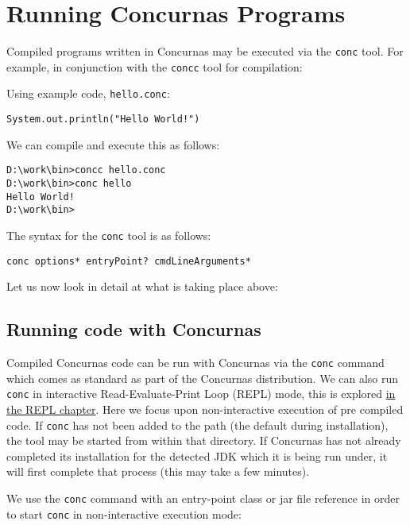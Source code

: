 \documentclass[conc-doc]{subfiles}
\begin{document}
	\chapter[Running Concurnas Programs]{Running Concurnas Programs}
	\label{ch:conc}

Compiled programs written in Concurnas may be executed via the \lstinline[language=None]{conc} tool. For example, in conjunction with the \lstinline[language=None]{concc} tool for compilation:


Using example code, \lstinline[language=None]{hello.conc}:
\begin{lstlisting}
System.out.println("Hello World!")
\end{lstlisting}

We can compile and execute this as follows:
\begin{lstlisting}[language=None]
D:\work\bin>concc hello.conc
D:\work\bin>conc hello
Hello World!
D:\work\bin>
\end{lstlisting}

The syntax for the \lstinline[language=None]{conc} tool is as follows:

\begin{center}
	\lstinline[language=None]{conc options* entryPoint? cmdLineArguments*}
\end{center}

Let us now look in detail at what is taking place above:

\section{Running code with Concurnas}
Compiled Concurnas code can be run with Concurnas via the \lstinline[language=None]{conc} command which comes as standard as part of the Concurnas distribution. We can also run \lstinline[language=None]{conc} in interactive Read-Evaluate-Print Loop (REPL) mode, this is explored \hyperref[ch:repl]{in the REPL chapter}. Here we focus upon non-interactive execution of pre compiled code. If \lstinline[language=None]{conc} has not been added to the path (the default during installation), the tool may be started from within that directory. If Concurnas has not already completed its installation for the detected JDK which it is being run under, it will first complete that process (this may take a few minutes).

We use the \lstinline[language=None]{conc} command with an entry-point class or jar file reference in order to start \lstinline[language=None]{conc} in non-interactive execution mode:
\end{document}
